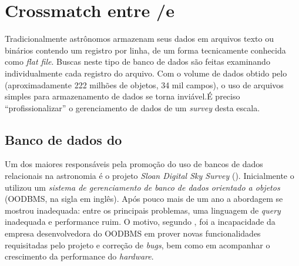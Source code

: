 


\chapter{Crossmatch entre \SDSS/\starlight e \galex}
\label{sec:Crossmatch}

Tradicionalmente astrônomos armazenam seus dados em arquivos texto ou binários
contendo um registro por linha, de um forma tecnicamente conhecida como {\em
flat file}. Buscas neste tipo de banco de dados são feitas examinando
individualmente cada registro do arquivo. Com o volume de dados obtido pelo
\galex (aproximadamente 222 milhões de objetos, 34 mil campos)\citneed, o uso de
arquivos simples para armazenamento de dados se torna inviável.\citneed É
preciso ``profissionalizar'' o gerenciamento de dados de um {\em survey} desta
escala.



\section{Banco de dados do \SDSS}

Um dos maiores responsáveis pela promoção do uso de bancos de dados relacionais
na astronomia é o projeto {\em Sloan Digital Sky Survey} (\SDSS). Inicialmente o
\SDSS utilizou um {\em sistema de gerenciamento de banco de dados orientado a
objetos} \citep{Maier1986} (OODBMS, na sigla em inglês). Após pouco mais de um
ano a abordagem se mostrou inadequada: entre os principais problemas, uma
linguagem de {\em query} inadequada e performance ruim. O motivo, segundo
\citet{Thakar2004}, foi a incapacidade da empresa desenvolvedora do OODBMS em
prover novas funcionalidades requisitadas pelo projeto e correção de {\em bugs},
bem como em acompanhar o crescimento da performance do {\em hardware}.

